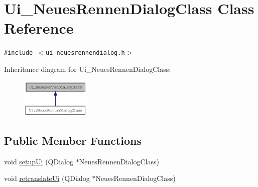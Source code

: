 \hypertarget{class_ui___neues_rennen_dialog_class}{
\section{Ui\_\-NeuesRennenDialogClass Class Reference}
\label{class_ui___neues_rennen_dialog_class}
}
{\tt \#include $<$ui\_\-neuesrennendialog.h$>$}

Inheritance diagram for Ui\_\-NeuesRennenDialogClass:\nopagebreak
\begin{figure}[H]
\begin{center}
\leavevmode
\includegraphics[width=94pt]{class_ui___neues_rennen_dialog_class__inherit__graph}
\end{center}
\end{figure}
\subsection*{Public Member Functions}
\begin{CompactItemize}
\item 
void \hyperlink{class_ui___neues_rennen_dialog_class_82bf9054e4760ff6638ded1c7e59df8a}{setupUi} (QDialog $\ast$NeuesRennenDialogClass)
\item 
void \hyperlink{class_ui___neues_rennen_dialog_class_c02fd0511765e9d5090ae696abc74f60}{retranslateUi} (QDialog $\ast$NeuesRennenDialogClass)
\end{CompactItemize}
